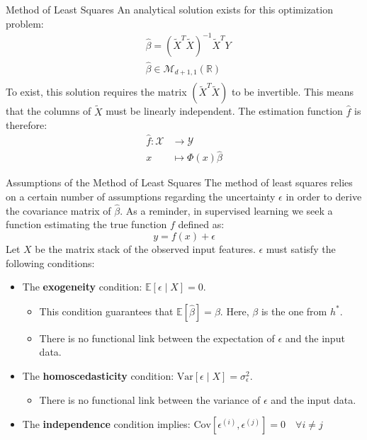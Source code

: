 \begin{frame}{Method of Least Squares}
	An analytical solution exists for this optimization problem:
	\begin{equation}
		\begin{aligned}
			&\hat{\beta} = \left( \tilde{X}^T \tilde{X}\right)^{-1} \tilde{X}^T Y \\
			&\hat{\beta} \in \mathcal{M}_{d+1, 1}(\mathbb{R}) \\
			\nonumber
		\end{aligned}
	\end{equation}
	To exist, this solution requires the matrix $\left(\tilde{X}^T \tilde{X}\right)$ to be invertible. This means that the columns of $\tilde{X}$ must be linearly independent.
	The estimation function $\hat{f}$ is therefore:
	\begin{equation}
		\begin{aligned}
			\hat{f}: \mathcal{X} &\to \mathcal{Y} \\
			x &\mapsto \Phi(x) \hat{\beta}
			\nonumber
		\end{aligned}
	\end{equation}
\end{frame}

\begin{frame}{Assumptions of the Method of Least Squares}
	The method of least squares relies on a certain number of assumptions regarding the uncertainty $\epsilon$ in order to derive the covariance matrix of $\hat{\beta}$. As a reminder, in supervised learning we seek a function estimating the true function $f$ defined as:
	\begin{equation}
		y = f(x) + \epsilon
		\nonumber
	\end{equation}
	Let $X$ be the matrix stack of the observed input features. $\epsilon$ must satisfy the following conditions:
	\begin{itemize}
		\item The \textbf{exogeneity} condition: $\mathbb{E}[\epsilon \mid X] = 0$.
		\begin{itemize}
			\item This condition guarantees that $\mathbb{E}[\hat{\beta}] = \beta$. Here, $\beta$ is the one from $h^*$.
			\item There is no functional link between the expectation of $\epsilon$ and the input data.
		\end{itemize}
		\item The \textbf{homoscedasticity} condition: $\text{Var}[\epsilon \mid X] = \sigma_{\epsilon}^2$.
		\begin{itemize}
			\item There is no functional link between the variance of $\epsilon$ and the input data.
		\end{itemize}
		\item The \textbf{independence} condition implies: $\text{Cov}[\epsilon^{(i)}, \epsilon^{(j)}] =0 \quad \forall i \ne j$
	\end{itemize}
\end{frame}

